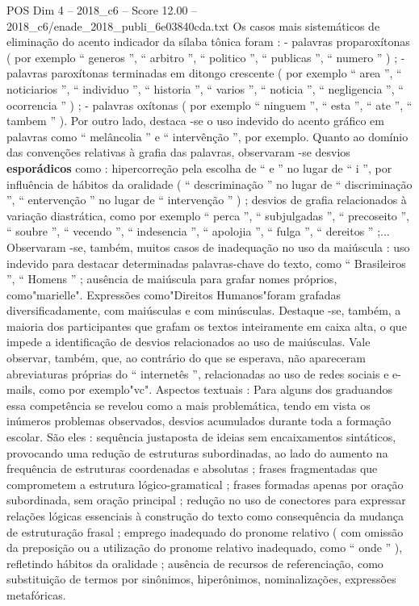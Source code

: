 \begin{textsample}{POS Dim 4 – 2018\_c6 – Score 12.00 – 2018\_c6/enade\_2018\_publi\_6e03840cda.txt}
Os casos mais sistemáticos de eliminação do acento indicador da sílaba tônica foram : - palavras proparoxítonas ( por exemplo “ generos ”, “ arbitro ”, “ politico ”, “ publicas ”, “ numero ” ) ; - palavras paroxítonas terminadas em ditongo crescente ( por exemplo “ area ”, “ noticiarios ”, “ individuo ”, “ historia ”, “ varios ”, “ noticia ”, “ negligencia ”, “ ocorrencia ” ) ; - palavras oxítonas ( por exemplo “ ninguem ”, “ esta ”, “ ate ”, “ tambem ” ).
Por outro lado, destaca -se o uso indevido do acento gráfico em palavras como “ melâncolia ” e “ intervênção ”, por exemplo.
Quanto ao domínio das convenções relativas à grafia das palavras, observaram -se desvios \textbf{esporádicos} como : hipercorreção pela escolha de “ e ” no lugar de “ i ”, por influência de hábitos da oralidade ( “ descriminação ” no lugar de “ discriminação ”, “ entervenção ” no lugar de “ intervenção ” ) ; desvios de grafia relacionados à variação diastrática, como por exemplo “ perca ”, “ subjulgadas ”, “ precoseito ”, “ soubre ”, “ vecendo ”, “ indesencia ”, “ apolojia ”, “ fulga ”, “ dereitos ” ;...
Observaram -se, também, muitos casos de inadequação no uso da maiúscula : uso indevido para destacar determinadas palavras-chave do texto, como “ Brasileiros ”, “ Homens ” ; ausência de maiúscula para grafar nomes próprios, como"marielle".
Expressões como"Direitos Humanos"foram grafadas diversificadamente, com maiúsculas e com minúsculas.
Destaque -se, também, a maioria dos participantes que grafam os textos inteiramente em caixa alta, o que impede a identificação de desvios relacionados ao uso de maiúsculas.
Vale observar, também, que, ao contrário do que se esperava, não apareceram abreviaturas próprias do “ internetês ”, relacionadas ao uso de redes sociais e e-mails, como por exemplo"vc".
Aspectos textuais : Para alguns dos graduandos essa competência se revelou como a mais problemática, tendo em vista os inúmeros problemas observados, desvios acumulados durante toda a formação escolar.
São eles : sequência justaposta de ideias sem encaixamentos sintáticos, provocando uma redução de estruturas subordinadas, ao lado do aumento na frequência de estruturas coordenadas e absolutas ; frases fragmentadas que comprometem a estrutura lógico-gramatical ; frases formadas apenas por oração subordinada, sem oração principal ; redução no uso de conectores para expressar relações lógicas essenciais à construção do texto como consequência da mudança de estruturação frasal ; emprego inadequado do pronome relativo ( com omissão da preposição ou a utilização do pronome relativo inadequado, como “ onde ” ), refletindo hábitos da oralidade ; ausência de recursos de referenciação, como substituição de termos por sinônimos, hiperônimos, nominalizações, expressões metafóricas.

\end{textsample}
